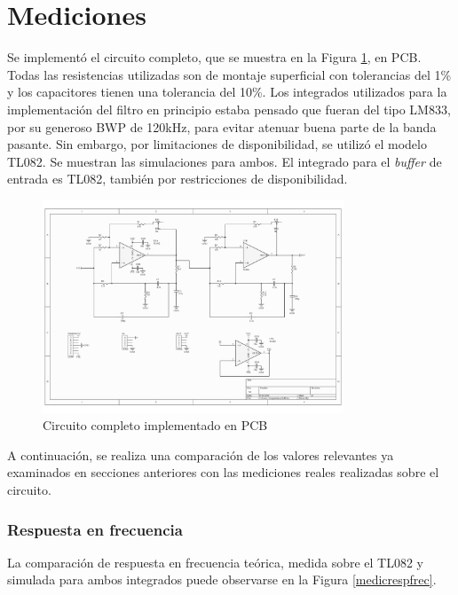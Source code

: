 \documentclass[spanish]{article}
\begin{document}
\section{Mediciones}
Se implementó el circuito completo, que se muestra en la Figura \ref{circuitocompleto}, en PCB. Todas las resistencias utilizadas son de montaje superficial con tolerancias del 1\% y  los capacitores tienen una tolerancia del 10\%. Los integrados utilizados para la implementación del filtro en principio estaba pensado que fueran del tipo LM833, por su generoso BWP de 120kHz, para evitar atenuar buena parte de la banda pasante. Sin embargo, por limitaciones de disponibilidad, se utilizó el modelo TL082. Se muestran las simulaciones para ambos. El integrado para el \emph{buffer} de entrada es TL082, también por restricciones de disponibilidad.

\begin{figure}[H]
    \centering
    \includegraphics[angle=90,origin=c,width=0.8\textwidth]{Resources/Esquematico.pdf}
    \caption{Circuito completo implementado en PCB}
    \label{circuitocompleto}
\end{figure}

A continuación, se realiza una comparación de los valores relevantes ya examinados en secciones anteriores con las mediciones reales realizadas sobre el circuito.

\subsubsection{Respuesta en frecuencia}
La comparación de respuesta en frecuencia teórica, medida sobre el TL082 y simulada para ambos integrados puede observarse en la Figura \ref{medicrespfrec}.
\end{document}
